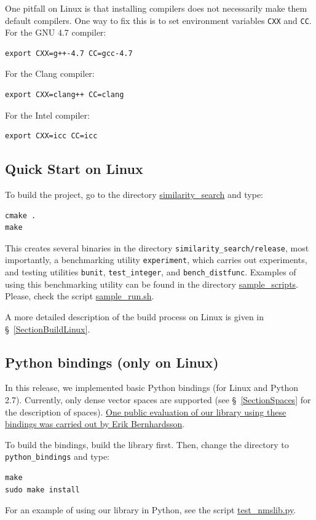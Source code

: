 \documentclass[runningheads,a4paper]{llncs}
\newcommand{\replocdir}{https://github.com/searchivarius/NonMetricSpaceLib/tree/develop}
\newcommand{\replocfile}{https://github.com/searchivarius/NonMetricSpaceLib/blob/develop/}
\newcommand{\ttt}[1]{\texttt{#1}}
\begin{document}
{One pitfall on Linux is that installing compilers does 
not necessarily make them default compilers.
One way to fix this is to set environment variables \ttt{CXX} and \ttt{CC}.
For the GNU 4.7 compiler:
\begin{verbatim}
export CXX=g++-4.7 CC=gcc-4.7 
\end{verbatim}
For the Clang compiler:
\begin{verbatim}
export CXX=clang++ CC=clang
\end{verbatim}
For the Intel compiler:
\begin{verbatim}
export CXX=icc CC=icc 
\end{verbatim}


\subsection{Quick Start on Linux}\label{QuickStartLinux}
To build the project, go to the directory \href{\replocdir similarity_search}{similarity\_search} and type:  
\begin{verbatim}
cmake .  
make   
\end{verbatim}
This creates several binaries in the directory \ttt{similarity\_search/release}, 
most importantly, 
a benchmarking utility \ttt{experiment}, which carries out experiments,
and testing utilities \ttt{bunit}, \ttt{test\_integer}, and \ttt{bench\_distfunc}.
Examples of using this benchmarking utility can be found in the directory \href{\replocdir sample_scripts}{sample\_scripts}. 
Please, check the script \href{\replocfile sample_scripts/sample_run.sh}{sample\_run.sh}. 

A more detailed description of the build process on Linux is given in \S~\ref{SectionBuildLinux}.


\subsection{Python bindings (only on Linux)}
In this release, we implemented basic Python bindings (for Linux and Python 2.7).
Currently, only dense vector spaces are supported (see \S~\ref{SectionSpaces} for the description of spaces).
\href{https://github.com/erikbern/ann-benchmarks}{One public evaluation of our library using these bindings was
carried out by Erik Bernhardsson}. 


To build the bindings, build the library first.
Then, change the directory to \ttt{python\_bindings} and type:
\begin{verbatim}
make
sudo make install
\end{verbatim} 
For an example of using our library in Python, see the script  \href{\replocfile python_bindings/test_nmslib.py}{test\_nmslib.py}.

}
\end{document}
